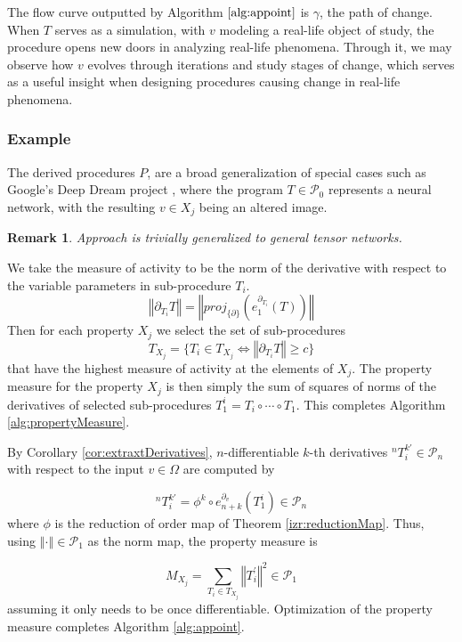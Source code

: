 \documentclass[preprint,12pt]{elsarticle}
\newcommand{\dP}{\mathcal{P}}
\newcommand{\D}{\partial}
\newtheorem{opomba}{Remark}[section]
\begin{document}
   The flow curve outputted by Algorithm $\ref{alg:appoint}$ is $\gamma$, the path of change. When $T$ serves as a simulation, with $v$ modeling a real-life object of study, the procedure opens new doors in analyzing real-life phenomena. Through it, we may observe how $v$ evolves through iterations and study stages of change, which serves as a useful insight when designing procedures causing change in real-life phenomena.
   
   \subsubsection{Example}
   
   The derived procedures $P$, are a broad generalization of special cases such as Google's Deep Dream project \cite{DeepDream}, where the program $T\in\dP_0$ represents a neural network, with the resulting $v\in X_j$ being an altered image.
   
   \begin{opomba}
      Approach is trivially generalized to general tensor networks.
      \end{opomba}
   
   We take the measure of activity to be the norm of the derivative with respect to the variable parameters in sub-procedure $T_i$.
   $$\left\Vert\D_{T_i}T\right\Vert=\left\Vert proj_{\{\D\}}\left(e^{\D_{T_i}}_1(T)\right)\right\Vert$$
   Then for each property $X_j$ we select the set of sub-procedures 
   $$T_{X_j}=\{T_i\in T_{X_j}\iff \left\Vert\D_{T_i}T\right\Vert\ge c\}$$
   that have the highest measure of activity at the elements of $X_j$. The property measure for the property $X_j$ is then simply the sum of squares of norms of the derivatives of selected sub-procedures $T^i_1=T_i\circ\cdots\circ T_1$. This completes Algorithm \ref{alg:propertyMeasure}. 
   
   By Corollary \ref{cor:extraxtDerivatives}, $n$-differentiable $k$-th derivatives $^{n}T^{k\prime}_i\in\dP_n$ with respect to the input $v\in\Omega$ are computed by
   
   \begin{equation}
   ^{n}T^{k\prime}_i=\phi^k\circ e^{\D_v}_{n+k}(T^i_1)\in\dP_n
   \end{equation}
   where $\phi$ is the reduction of order map of Theorem \ref{izr:reductionMap}.
   Thus, using $\left\Vert\cdot\right\Vert\in\dP_1$ as the norm map, the property measure is
   
   \begin{equation}
   M_{X_j}=\sum\limits_{T_i\in T_{X_j}} \left\Vert T^\prime_i\right\Vert^2\in\dP_1
   \end{equation}
   assuming it only needs to be once differentiable. Optimization of the property measure completes Algorithm \ref{alg:appoint}.
   
\end{document}
